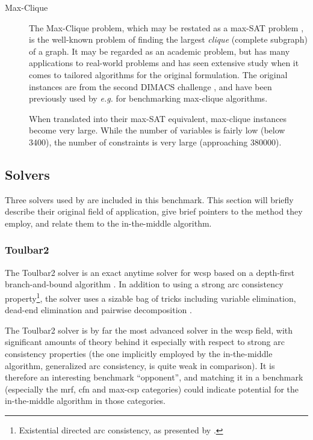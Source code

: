 \begin{description}
	\item[Max-Clique]
		The Max-Clique problem, which may be restated as a max-SAT problem \parencite{Heras08}, is the well-known problem of finding the largest \emph{clique} (complete subgraph) of a graph.
		It may be regarded as an academic problem, but has many applications to real-world problems and has seen extensive study when it comes to tailored algorithms for the original formulation.
		The original instances are from the second DIMACS challenge \parencite{Johnson96}, and have been previously used by \emph{e.g.} \textcite{Östergård02} for benchmarking max-clique algorithms.

		When translated into their max-SAT equivalent, max-clique instances become very large. While the number of variables is fairly low (below \num{3400}), the number of constraints is very large (approaching \num{380000}).
\end{description}

\subsection{Solvers}
Three solvers used by \textcite{deGivry14} are included in this benchmark.
This section will briefly describe their original field of application, give brief pointers to the method they employ, and relate them to the in-the-middle algorithm.

\subsubsection{Toulbar2}
The Toulbar2 solver is an exact anytime solver for \gls{wcsp} based on a depth-first branch-and-bound algorithm \parencite{Allouche10}.
In addition to using a strong arc consistency property\footnote{Existential directed arc consistency, as presented by \textcite{deGivry05}.}, the solver uses a sizable bag of tricks including variable elimination, dead-end elimination \parencite{deGivry13} and pairwise decomposition \parencite{Favier11}.

The Toulbar2 solver is by far the most advanced solver in the \gls{wcsp} field, with significant amounts of theory behind it especially with respect to strong arc consistency properties (the one implicitly employed by the in-the-middle algorithm, generalized arc consistency, is quite weak in comparison).
It is therefore an interesting benchmark \enquote{opponent}, and matching it in a benchmark (especially the \gls{mrf}, \gls{cfn} and max-\gls{csp} categories) could indicate potential for the in-the-middle algorithm in those categories.

